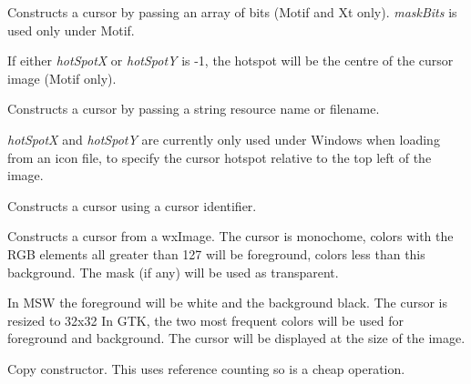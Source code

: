 Constructs a cursor by passing an array of bits (Motif and Xt only). {\it maskBits} is used only under Motif.

If either {\it hotSpotX} or {\it hotSpotY} is -1, the hotspot will be the centre of the cursor image (Motif only).


Constructs a cursor by passing a string resource name or filename.

{\it hotSpotX} and {\it hotSpotY} are currently only used under Windows when loading from an
icon file, to specify the cursor hotspot relative to the top left of the image.


Constructs a cursor using a cursor identifier.


Constructs a cursor from a wxImage. The cursor is monochome, colors with the RGB elements all greater
than 127 will be foreground, colors less than this background. The mask (if any) will be used as transparent.

In MSW the foreground will be white and the background black. The cursor is resized to 32x32
In GTK, the two most frequent colors will be used for foreground and background. The cursor will be displayed
at the size of the image.


Copy constructor. This uses reference counting so is a cheap operation.








